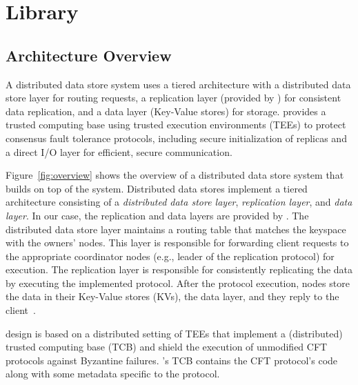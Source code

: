 \section{\projecttitle Library}
\label{sec:abstraction}
\label{sec:recipe-implementation}




\subsection{\projecttitle{} Architecture Overview} \label{subsec:overview}
A distributed data store system uses a tiered architecture with a distributed data store layer for routing requests, a replication layer (provided by \projecttitle{}) for consistent data replication, and a data layer (Key-Value stores) for storage.  \projecttitle{} provides a trusted computing base using trusted execution environments (TEEs) to protect consensus fault tolerance protocols, including secure initialization of replicas and a direct I/O layer for efficient, secure communication.


Figure~\ref{fig:overview} shows the overview of a distributed data store system that builds on top of the \projecttitle{} system.  Distributed data stores implement a tiered architecture consisting of a \emph{distributed data store layer}, \emph{replication layer}, and  \emph{data layer}. In our case, the replication and data layers are provided by \projecttitle{}. The distributed data store layer maintains a routing table that matches the keyspace with the owners' nodes. This layer is responsible for forwarding client requests to the appropriate coordinator nodes (e.g., leader of the replication protocol) for execution. The \projecttitle{} replication layer is responsible for consistently replicating the data by executing the implemented protocol. After the protocol execution, \projecttitle{} nodes store the data in their Key-Value stores (KVs), the data layer, and they reply to the client~\cite{redis, rocksdb, leveldb, memcached2004}.

 \projecttitle{} design is based on a distributed setting of TEEs that implement a (distributed) trusted computing base (TCB) and shield the execution of unmodified CFT protocols against Byzantine failures. \projecttitle{}'s TCB contains the CFT protocol's code along with some metadata specific to the protocol. 


